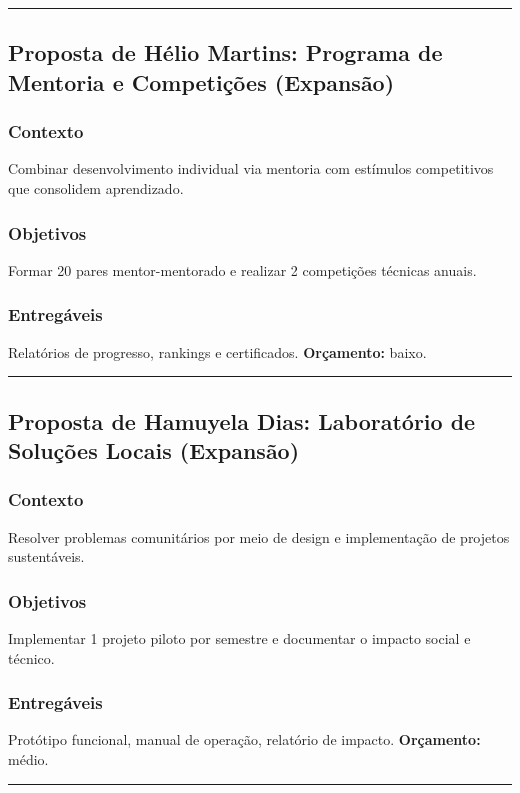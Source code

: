 \documentclass[12pt,a4paper]{article}
\newcommand{\proposalsep}{%
  \vspace{6pt}%
  {\color{gold}\rule{0.35\linewidth}{0.7pt}}%
  \vspace{4pt}%
}
\begin{document}
\proposalsep

\subsection{Proposta de Hélio Martins: Programa de Mentoria e Competições (Expansão)}

\subsubsection*{Contexto}
Combinar desenvolvimento individual via mentoria com estímulos competitivos que consolidem aprendizado.

\subsubsection*{Objetivos}
Formar 20 pares mentor-mentorado e realizar 2 competições técnicas anuais.

\subsubsection*{Entregáveis}
Relatórios de progresso, rankings e certificados. \textbf{Orçamento:} baixo.

\proposalsep

\subsection{Proposta de Hamuyela Dias: Laboratório de Soluções Locais (Expansão)}

\subsubsection*{Contexto}
Resolver problemas comunitários por meio de design e implementação de projetos sustentáveis.

\subsubsection*{Objetivos}
Implementar 1 projeto piloto por semestre e documentar o impacto social e técnico.

\subsubsection*{Entregáveis}
Protótipo funcional, manual de operação, relatório de impacto. \textbf{Orçamento:} médio.

\proposalsep
\end{document}
